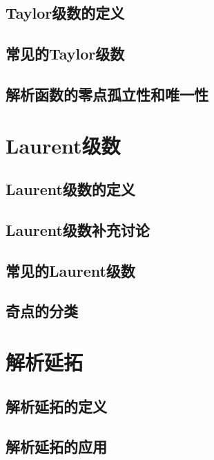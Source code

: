     \subsection{Taylor级数的定义}

    \subsection{常见的Taylor级数}

    \subsection{解析函数的零点孤立性和唯一性}

\section{Laurent级数}
    \subsection{Laurent级数的定义}

    \subsection{Laurent级数补充讨论}

    \subsection{常见的Laurent级数}

    \subsection{奇点的分类}


\section{解析延拓}

    \subsection{解析延拓的定义}

    \subsection{解析延拓的应用}